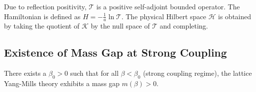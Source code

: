 Due to reflection positivity, $\mathcal{T}$ is a positive self-adjoint bounded operator. The Hamiltonian is defined as $H = -\frac{1}{a} \ln \mathcal{T}$.
The physical Hilbert space $\mathcal{H}$ is obtained by taking the quotient of $\mathcal{K}$ by the null space of $\mathcal{T}$ and completing.


\subsection{Existence of Mass Gap at Strong Coupling}
\label{subsec:strong_coupling}

\begin{theorem}
\label{thm:strong_coupling_gap}
There exists a $\beta_0 > 0$ such that for all $\beta < \beta_0$ (strong coupling regime), the lattice Yang-Mills theory exhibits a mass gap $m(\beta) > 0$.
\end{theorem}

